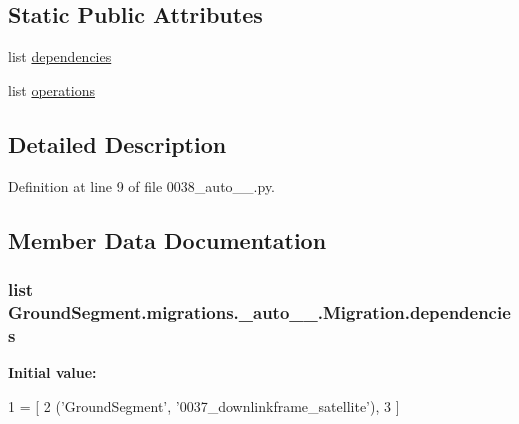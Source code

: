 \subsection*{Static Public Attributes}
\begin{DoxyCompactItemize}
\item 
list \hyperlink{class_ground_segment_1_1migrations_1_10038__auto__20170131__1736_1_1_migration_a917f78f67e89031056e1d5da3a2c9498}{dependencies}
\item 
list \hyperlink{class_ground_segment_1_1migrations_1_10038__auto__20170131__1736_1_1_migration_aa89898fa66dc9ffaac0f18c0de940d7c}{operations}
\end{DoxyCompactItemize}


\subsection{Detailed Description}


Definition at line 9 of file 0038\+\_\+auto\+\_\+\_.\+py.



\subsection{Member Data Documentation}
\hypertarget{class_ground_segment_1_1migrations_1_10038__auto__20170131__1736_1_1_migration_a917f78f67e89031056e1d5da3a2c9498}{}
\subsubsection[{dependencies}]{\setlength{\rightskip}{0pt plus 5cm}list Ground\+Segment.\+migrations.\+\_\+auto\+\_\+\_.\+Migration.\+dependencies\hspace{0.3cm}{\ttfamily [static]}}\label{class_ground_segment_1_1migrations_1_10038__auto__20170131__1736_1_1_migration_a917f78f67e89031056e1d5da3a2c9498}
{\bfseries Initial value\+:}
\begin{DoxyCode}
1 = [
2         (\textcolor{stringliteral}{'GroundSegment'}, \textcolor{stringliteral}{'0037\_downlinkframe\_satellite'}),
3     ]
\end{DoxyCode}


